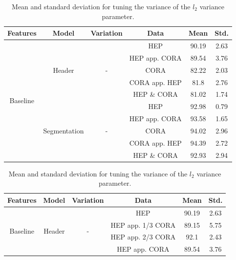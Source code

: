 \begin{table}[t]
\begin{center}
\begin{tabular}{|c|c|c|c|c|c|}
\hline
Features & Model & Variation & Data & Mean & Std.\\
\hline
\multirow{10}{*}{Baseline} & \multirow{5}{*}{Header} & \multirow{5}{*}{-} & HEP & 90.19 & 2.63\\\cline{4-6}
& & & HEP app. CORA & 89.54 & 3.76\\\cline{4-6}
& & & CORA & 82.22 & 2.03\\\cline{4-6}
& & & CORA app. HEP & 81.8 & 2.76\\\cline{4-6}
& & & HEP \& CORA & 81.02 & 1.74\\\cline{2-6}
& \multirow{5}{*}{Segmentation} & \multirow{5}{*}{-} & HEP & 92.98 & 0.79\\\cline{4-6}
& & & HEP app. CORA & 93.58 & 1.65\\\cline{4-6}
& & & CORA & 94.02 & 2.96\\\cline{4-6}
& & & CORA app. HEP & 94.39 & 2.72\\\cline{4-6}
& & & HEP \& CORA & 92.93 & 2.94\\\cline{4-6}
\hline
\end{tabular}
\caption[Mean and standard deviation for tuning the variance of the $l_2$ variance parameter.]{Mean and standard deviation for tuning the variance of the $l_2$ variance parameter.}
\label{table:baselineresults}
\end{center}
\end{table}

\begin{table}[t]
\begin{center}
\begin{tabular}{|c|c|c|c|c|c|}
\hline
Features & Model & Variation & Data & Mean & Std.\\
\hline
\multirow{4}{*}{Baseline} & \multirow{4}{*}{Header} & \multirow{4}{*}{-} & HEP & 90.19 & 2.63\\\cline{4-6}
& & & HEP app. 1/3 CORA & 89.15 & 5.75\\\cline{4-6}
& & & HEP app. 2/3 CORA & 92.1 & 2.43\\\cline{4-6}
& & & HEP app. CORA & 89.54 & 3.76\\\cline{4-6}
\hline
\end{tabular}
\caption[Mean and standard deviation for tuning the variance of the $l_2$ variance parameter.]{Mean and standard deviation for tuning the variance of the $l_2$ variance parameter.}
\label{table:subsampling}
\end{center}
\end{table}

